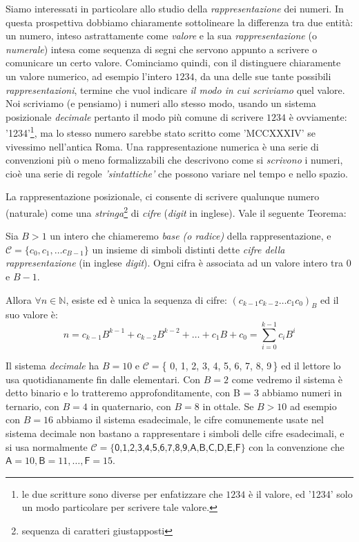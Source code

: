 Siamo interessati in particolare allo studio della \emph{rappresentazione} dei numeri. In questa prospettiva dobbiamo chiaramente sottolineare la differenza tra due entità: un numero, inteso astrattamente come \emph{valore} e la sua
\emph{rappresentazione} (o \emph{numerale}) intesa come sequenza di segni che
servono appunto a scrivere o comunicare un certo valore.
Cominciamo quindi,  con il distinguere
chiaramente un valore numerico, ad esempio l'intero $1234$, da una delle sue tante possibili \emph{rappresentazioni}, termine che vuol indicare \emph{il modo
in cui scriviamo} quel valore. Noi scriviamo (e pensiamo) i numeri allo stesso
modo, usando un sistema posizionale \emph{decimale} pertanto il modo più comune
di scrivere $1234$ è ovviamente: \textsf{'1234'}\footnote{le due scritture sono
diverse per enfatizzare che $1234$ è il valore, ed \textsf{'1234'} solo un modo
particolare per scrivere tale valore.}, ma lo stesso numero sarebbe stato
scritto come \textsf{'MCCXXXIV'} se vivessimo nell'antica Roma. Una
rappresentazione numerica è una serie di convenzioni più o meno formalizzabili
che descrivono come si \emph{scrivono} i numeri, cioè una serie di regole
\emph{'sintattiche'} che possono variare nel tempo e nello spazio.

La rappresentazione posizionale, ci consente di scrivere qualunque numero
(naturale) come una \emph{stringa}\footnote{sequenza di caratteri giustapposti}
di \emph{cifre} (\emph{digit} in inglese). Vale il seguente Teorema:



\begin{thm} Sia $B>1$ un intero che chiameremo \emph{base (o radice)} della rap\-presentazione, e $\mathcal{C} = \{ c_0, c_1, \ldots c_{B-1} \}$ un insieme di simboli distinti dette \emph{cifre della rappresentazione} (in inglese \emph{digit}). Ogni cifra è associata ad un valore intero tra $0$ e $B-1$.\bigskip

Allora $\forall n \in \mathbb{N}$, esiste ed è unica la sequenza di cifre: 
$(c_{k-1}c_{k-2} \ldots c_1c_0)_B$ ed il suo valore è:
\begin{equation}\label{eq:pos} 
	n = c_{k-1}B^{k-1}+c_{k-2}B^{k-2}+\ldots+c_1B+c_0 = \sum_{i=0}^{k-1} c_iB^i 
\end{equation}
\end{thm} %

Il sistema \emph{decimale} ha $B = 10$ e $\mathcal{C} = $\{\textsf{ 0, 1, 2, 3,
4, 5, 6, 7, 8, 9}\,\} ed il lettore lo usa quotidianamente fin dalle
elementari.  Con $B =
2$ come vedremo il sistema è detto binario e lo tratteremo approfonditamente,
con B = 3 abbiamo numeri in ternario, con $B = 4$ in quaternario, con $B = 8$
in ottale. Se $B > 10$ ad esempio con $B = 16$ abbiamo il sistema esadecimale,
le cifre comunemente usate nel sistema decimale non bastano a rappresentare i
simboli delle cifre esadecimali, e si usa normalmente $\mathcal{C} = \{
\textsf{0,1,2,3,4,5,6,7,8,9,A,B,C,D,E,F} \}$ con la convenzione che $\textsf{A}
= 10, \textsf{B} = 11, \ldots, \textsf{F} = 15$.

